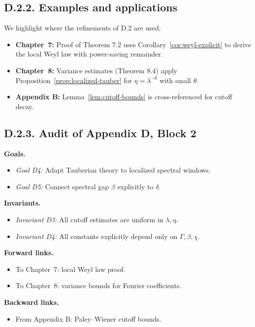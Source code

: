 \medskip

\subsection*{D.2.2. Examples and applications}

\noindent We highlight where the refinements of D.2 are used:

\begin{itemize}
\item \textbf{Chapter~7:} Proof of Theorem 7.2 uses Corollary~\ref{cor:weyl-explicit} to derive the local Weyl law with power-saving remainder.  
\item \textbf{Chapter~8:} Variance estimates (Theorem 8.4) apply Proposition~\ref{prop:localized-tauber} for $\eta=\lambda^{-\theta}$ with small $\theta$.  
\item \textbf{Appendix B:} Lemma~\ref{lem:cutoff-bounds} is cross-referenced for cutoff decay.  
\end{itemize}

\medskip

\subsection*{D.2.3. Audit of Appendix D, Block 2}

\noindent \textbf{Goals.}
\begin{itemize}
\item \emph{Goal D4:} Adapt Tauberian theory to localized spectral windows.  
\item \emph{Goal D5:} Connect spectral gap $\beta$ explicitly to $\delta$.  
\end{itemize}

\noindent \textbf{Invariants.}
\begin{itemize}
\item \emph{Invariant D3:} All cutoff estimates are uniform in $\lambda,\eta$.  
\item \emph{Invariant D4:} All constants explicitly depend only on $\Gamma,\beta,\chi$.  
\end{itemize}

\noindent \textbf{Forward links.}
\begin{itemize}
\item To Chapter~7: local Weyl law proof.  
\item To Chapter~8: variance bounds for Fourier coefficients.  
\end{itemize}

\noindent \textbf{Backward links.}
\begin{itemize}
\item From Appendix B: Paley–Wiener cutoff bounds.  
\end{itemize}


